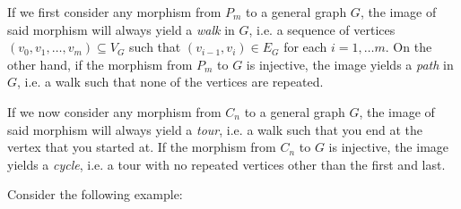 \documentclass{article}
\begin{document}
If we first consider any morphism from $P_m$ to a general graph $G$, the image of said morphism will always yield a \textit{walk} in $G$, i.e. a sequence of vertices $(v_0, v_1 , \ldots, v_m) \subseteq V_G$ such that $(v_{i-1},v_{i}) \in E_G$ for each $i=1,\ldots m$.  On the other hand, if the morphism from $P_m$ to $G$ is injective, the image yields a \textit{path} in $G$, i.e. a walk such that none of the vertices are repeated.

If we now consider any morphism from $C_n$ to a general graph $G$, the image of said morphism will always yield a \textit{tour}, i.e. a walk such that you end at the vertex that you started at.  If the morphism from $C_n$ to $G$ is injective, the image yields a \textit{cycle}, i.e. a tour with no repeated vertices other than the first and last.

Consider the following example:
\end{document}
